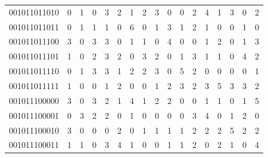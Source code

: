 \documentclass[10pt,a4paper]{article}
\begin{document}
\begin{longtable}{ |c|c|c|c|c|c|c|c|c|c|c|c|c|c|c|c|c| }
    001011011010              & 0                            & 1                                & 0                            & 3                              & 2   & 1   & 2   & 3   & 0   & 0   & 2   & 4   & 1   & 3   & 0   & 2   \\
    001011011011              & 0                            & 1                                & 1                            & 1                              & 0   & 6   & 0   & 1   & 3   & 1   & 2   & 1   & 0   & 0   & 1   & 0   \\
    001011011100              & 3                            & 0                                & 3                            & 3                              & 0   & 1   & 1   & 0   & 4   & 0   & 0   & 1   & 2   & 0   & 1   & 3   \\
    001011011101              & 1                            & 0                                & 2                            & 3                              & 2   & 0   & 3   & 2   & 0   & 1   & 3   & 1   & 1   & 0   & 4   & 2   \\
    001011011110              & 0                            & 1                                & 3                            & 3                              & 1   & 2   & 2   & 3   & 0   & 5   & 2   & 0   & 0   & 0   & 0   & 1   \\
    001011011111              & 1                            & 0                                & 0                            & 1                              & 2   & 0   & 0   & 1   & 2   & 3   & 2   & 3   & 5   & 3   & 3   & 2   \\
    001011100000              & 3                            & 0                                & 3                            & 2                              & 1   & 4   & 1   & 2   & 2   & 0   & 0   & 1   & 1   & 0   & 1   & 5   \\
    001011100001              & 0                            & 3                                & 2                            & 2                              & 0   & 1   & 0   & 0   & 0   & 0   & 3   & 4   & 0   & 1   & 2   & 0   \\
    001011100010              & 3                            & 0                                & 0                            & 0                              & 2   & 0   & 1   & 1   & 1   & 1   & 2   & 2   & 2   & 5   & 2   & 2   \\
    001011100011              & 1                            & 1                                & 0                            & 3                              & 4   & 1   & 0   & 0   & 1   & 1   & 2   & 0   & 2   & 1   & 0   & 4   \\

\end{longtable}
\end{document}
